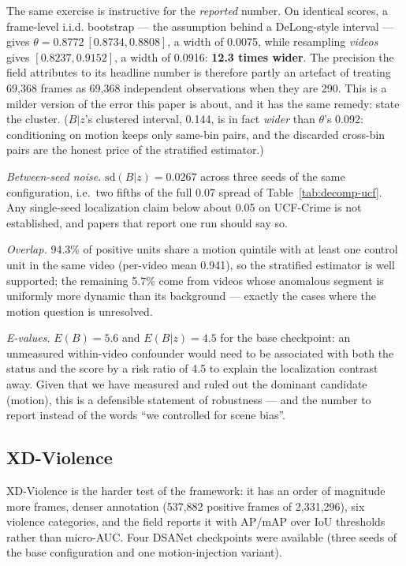 \documentclass[number,preprint,12pt]{elsarticle}
\begin{document}
The same exercise is instructive for the \emph{reported} number. On identical scores,
a frame-level i.i.d. bootstrap --- the assumption behind a DeLong-style interval \citep{delong1988comparing} ---
gives \(\theta=0.8772\ [0.8734,0.8808]\), a width of 0.0075, while resampling
\emph{videos} gives \([0.8237,0.9152]\), a width of 0.0916: \textbf{12.3 times wider}. The
precision the field attributes to its headline number is therefore partly an
artefact of treating 69,368 frames as 69,368 independent observations when they
are 290. This is a milder version of the error this paper is about, and it has
the same remedy: state the cluster. (\(B|z\)'s clustered interval, 0.144, is in
fact \emph{wider} than \(\theta\)'s 0.092: conditioning on motion keeps only same-bin
pairs, and the discarded cross-bin pairs are the honest price of the stratified
estimator.)

\emph{Between-seed noise.} \(\mathrm{sd}(B|z)=0.0267\) across three seeds of the same
configuration, i.e.~two fifths of the full 0.07 spread of Table~\ref{tab:decomp-ucf}. Any single-seed
localization claim below about 0.05 on UCF-Crime is not established, and papers that
report one run should say so.

\emph{Overlap.} 94.3\% of positive units share a motion quintile with at least one
control unit in the same video (per-video mean 0.941), so the stratified
estimator is well supported; the remaining 5.7\% come from videos whose
anomalous segment is uniformly more dynamic than its background --- exactly the
cases where the motion question is unresolved.

\emph{E-values.} \(E(B)=5.6\) and \(E(B|z)=4.5\) for the base checkpoint: an
unmeasured within-video confounder would need to be associated with both the
status and the score by a risk ratio of 4.5 to explain the localization contrast
away. Given that we have measured and ruled out the dominant candidate (motion),
this is a defensible statement of robustness --- and the number to report instead
of the words ``we controlled for scene bias''.

\subsection{XD-Violence}\label{sec:xd}

XD-Violence is the harder test of the framework: it has an order of magnitude
more frames, denser annotation (537,882 positive frames of 2,331,296), six
violence categories, and the field reports it with AP/mAP over IoU thresholds rather than
micro-AUC. Four DSANet checkpoints were available (three seeds of the base
configuration and one motion-injection variant).
\end{document}
